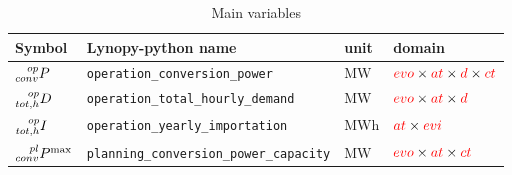 \documentclass[a4paper,11pt]{article}
\begin{document}
\begin{table}[h]
\footnotesize %
  \centering
    \caption{Main variables}
  \begin{tabular}{llll}
    \hline
    
    \textbf{Symbol} & \textbf{Lynopy-python name} & \textbf{unit}  & \textbf{domain} \\ \hline
    
    $ \prescript{op}{conv}{P}$ & \verb|operation_conversion_power|  & MW & $\textcolor{red}{evo} \times \textcolor{red}{at} \times \textcolor{red}{d} \times \textcolor{red}{ct}$ \\
    
    $\prescript{op}{tot,h}{D} $ & \verb|operation_total_hourly_demand|& MW & $\textcolor{red}{evo} \times \textcolor{red}{at} \times \textcolor{red}{d}$ \\ 
    
    $\prescript{op}{tot,h}{I} $& \verb|operation_yearly_importation|& MWh & $\textcolor{red}{at} \times \textcolor{red}{evi}$ \\ \hline
    
    $\prescript{pl}{conv}{P^{\max}}$ & \verb|planning_conversion_power_capacity|& MW & $\textcolor{red}{evo} \times \textcolor{red}{at} \times \textcolor{red}{ct}$ \\ \hline
    
  \end{tabular}
\end{table}
\end{document}
